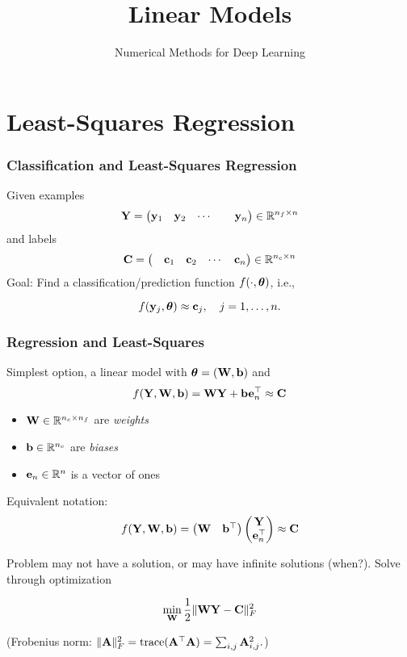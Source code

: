 \documentclass[12pt,fleqn,beamer]{beamer}
\title{Linear Models}
\subtitle{Numerical Methods for Deep Learning}
\date{}
\begin{document}
\makebeamertitle


\section{Least-Squares Regression} %
\label{sec:least_squares_regression}
\begin{frame}\frametitle{Classification and Least-Squares Regression}

Given examples
$$ {\bf Y} = \begin{pmatrix}  {\bf y}_1 &  {\bf y}_2   & \cdots & & {\bf y}_n \end{pmatrix} \in\mathbb{R}^{n_f\times n}$$
and labels
$$ {\bf C} = \begin{pmatrix} & {\bf c}_1  &  {\bf c}_2  & \cdots &  {\bf c}_n \end{pmatrix} \in\mathbb{R}^{n_c\times n}$$
Goal: Find a classification/prediction function $f(\cdot,{\boldsymbol \theta})$, i.e., 

$$
f({\bf y}_j,{\boldsymbol \theta}) \approx {\bf c}_j, \quad j=1,\ldots,n.
$$

\end{frame}

\begin{frame}\frametitle{Regression and Least-Squares}

Simplest option, a linear model with ${\boldsymbol \theta} = ({\bf W},{\bf b})$ and
$$ f({\bf Y},{\bf W},{\bf b}) =  {\bf W} {\bf Y} + {\bf b} {\bf e}_n^\top \approx {\bf C} $$
\begin{itemize}
	\item ${\bf W} \in \mathbb{R}^{n_c \times n_f}$ are \emph{weights}
	\item ${\bf b} \in \mathbb{R}^{n_c}$ are \emph{biases}
	\item ${\bf e}_n \in \mathbb{R}{^n}$ is a vector of ones
\end{itemize} 
Equivalent notation:
$$f({\bf Y},{\bf W},{\bf b}) = \begin{pmatrix} {\bf W} & {\bf b}^\top \end{pmatrix} \begin{pmatrix} {\bf Y} \\ {\bf e}_n^\top \end{pmatrix} \approx {\bf C}$$

Problem may not have a solution, or may have infinite solutions (when?).
Solve through optimization
 
$$ \min_{{\bf W}} {\frac 12} \|{\bf W} {\bf Y} - {\bf C}\|^2_F $$

(Frobenius norm: $\|{\bf A}\|_F^2 = {\rm trace}({\bf A}^{\top} {\bf A}) = \sum_{i,j} {\bf A}_{i,j}^2. $)

\end{frame}
\end{document}
